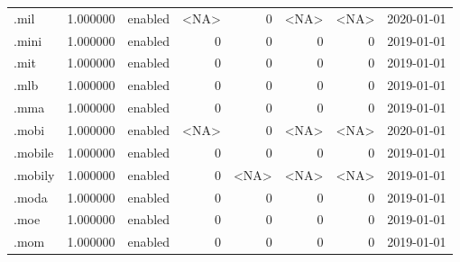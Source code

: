 \begin{tabular}{lrlrrrrl}
.mil                      &          1.000000 &         enabled &                        <NA> &                           0 &                        <NA> &                <NA> &           2020-01-01 \\
.mini                     &          1.000000 &         enabled &                           0 &                           0 &                           0 &                   0 &           2019-01-01 \\
.mit                      &          1.000000 &         enabled &                           0 &                           0 &                           0 &                   0 &           2019-01-01 \\
.mlb                      &          1.000000 &         enabled &                           0 &                           0 &                           0 &                   0 &           2019-01-01 \\
.mma                      &          1.000000 &         enabled &                           0 &                           0 &                           0 &                   0 &           2019-01-01 \\
.mobi                     &          1.000000 &         enabled &                        <NA> &                           0 &                        <NA> &                <NA> &           2020-01-01 \\
.mobile                   &          1.000000 &         enabled &                           0 &                           0 &                           0 &                   0 &           2019-01-01 \\
.mobily                   &          1.000000 &         enabled &                           0 &                        <NA> &                        <NA> &                <NA> &           2019-01-01 \\
.moda                     &          1.000000 &         enabled &                           0 &                           0 &                           0 &                   0 &           2019-01-01 \\
.moe                      &          1.000000 &         enabled &                           0 &                           0 &                           0 &                   0 &           2019-01-01 \\
.mom                      &          1.000000 &         enabled &                           0 &                           0 &                           0 &                   0 &           2019-01-01 \\

\end{tabular}
